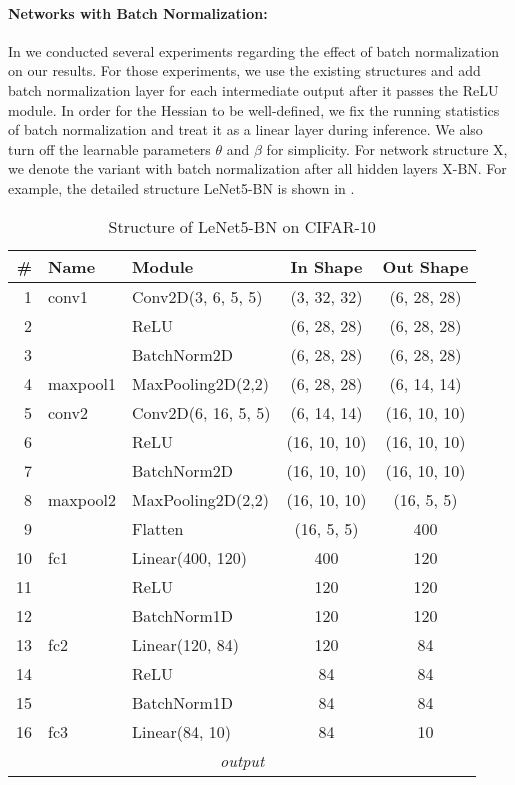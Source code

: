 \paragraph{Networks with Batch Normalization:} In  we conducted several experiments regarding the effect of batch normalization on our results. For those experiments, we use the existing structures and add batch normalization layer for each intermediate output after it passes the ReLU module. In order for the Hessian to be well-defined, we fix the running statistics of batch normalization and treat it as a linear layer during inference. We also turn off the learnable parameters $\theta$ and $\beta$ \citep{ioffe2015batch} for simplicity. For network structure X, we denote the variant with batch normalization after all hidden layers X-BN.
For example, the detailed structure LeNet5-BN is shown in .

\begin{table}[h]
\small
  \centering
  \caption{Structure of LeNet5-BN on CIFAR-10}
  \vskip 0.1in
  \begin{center}
    \begin{tabular}{rllcc}
    \toprule
    \# & Name & Module & In Shape & Out Shape\\\midrule
    1 & conv1 & Conv2D(3, 6, 5, 5) & (3, 32, 32) & (6, 28, 28)\\
    2 & & ReLU & (6, 28, 28) & (6, 28, 28)\\
    3 & & BatchNorm2D & (6, 28, 28) & (6, 28, 28)\\
    4 & maxpool1 & MaxPooling2D(2,2) & (6, 28, 28) & (6, 14, 14)\\
    5 & conv2 & Conv2D(6, 16, 5, 5) & (6, 14, 14) & (16, 10, 10)\\
    6 & & ReLU & (16, 10, 10) & (16, 10, 10)\\
    7 & & BatchNorm2D & (16, 10, 10) & (16, 10, 10)\\
    8 & maxpool2 & MaxPooling2D(2,2) & (16, 10, 10) & (16, 5, 5)\\
    9 & & Flatten & (16, 5, 5) & 400\\
    10 & fc1 & Linear(400, 120) & 400 & 120\\
    11 & & ReLU & 120 & 120\\
    12 & & BatchNorm1D & 120 & 120\\
    13 & fc2 & Linear(120, 84) & 120 & 84\\
    14 & & ReLU & 84 & 84\\
    15 & & BatchNorm1D & 84 & 84\\
    16 & fc3 & Linear(84, 10) & 84 & 10\\
    \multicolumn{5}{c}{\emph{output}} \\\bottomrule
    \end{tabular}%
\end{center}
  \label{tab:appendix_lenetBN_struct}%
\end{table}%

